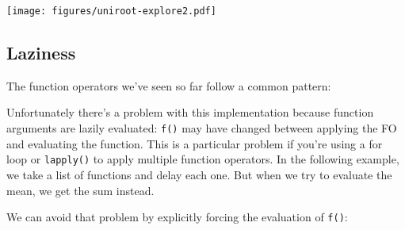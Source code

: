 \texttt{[image: figures/uniroot-explore2.pdf]}

\subsection{Laziness}

The function operators we've seen so far follow a common pattern:

\begin{Shaded}
\begin{Highlighting}[]
\StringTok{ }
    \StringTok{ }
  \NormalTok{\}}
\NormalTok{\}}
\end{Highlighting}
\end{Shaded}

Unfortunately there's a problem with this implementation because
function arguments are lazily evaluated: \texttt{f()} may have changed
between applying the FO and evaluating the function. This is a
particular problem if you're using a for loop or \texttt{lapply()} to
apply multiple function operators. In the following example, we take a
list of functions and delay each one. But when we try to evaluate the
mean, we get the sum instead. 

\begin{Shaded}
\begin{Highlighting}[]
\StringTok{ }\NormalTok{(}  
\StringTok{ } \NormalTok{)}

\NormalTok{(}\NormalTok{:}\NormalTok{)}
\end{Highlighting}
\end{Shaded}

We can avoid that problem by explicitly forcing the evaluation of
\texttt{f()}:

\begin{Shaded}
\begin{Highlighting}[]
\StringTok{ }
  \NormalTok{\}}
\NormalTok{\}}

\StringTok{ } \NormalTok{)}
\NormalTok{(}\NormalTok{:}\NormalTok{)}
\end{Highlighting}
\end{Shaded}

